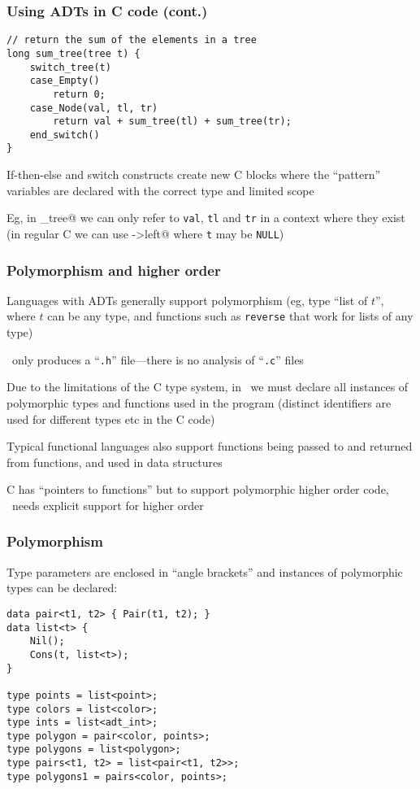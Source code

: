 \documentclass[t,t]{beamer}
\begin{document}
\begin{frame}[fragile]
\frametitle{Using ADTs in C code (cont.)}
\begin{verbatim}
// return the sum of the elements in a tree
long sum_tree(tree t) {
    switch_tree(t)
    case_Empty()
        return 0;
    case_Node(val, tl, tr)
        return val + sum_tree(tl) + sum_tree(tr);
    end_switch()
}
\end{verbatim}
If-then-else and switch constructs create new C blocks where
the ``pattern'' variables are declared with the correct type
and limited scope

Eg, in \verb@sum_tree@ we can only refer to \texttt{val},
\texttt{tl} and \texttt{tr} in a context where they exist
(in regular C we can use \verb@t->left@ where
\texttt{t} may be \texttt{NULL})  
\end{frame}

\begin{frame}
\frametitle{Polymorphism and higher order}
Languages with ADTs generally support polymorphism (eg, type
``list of $t$'', where $t$ can be any type, and functions such
as \texttt{reverse} that work for lists of any type)

\Adtpp\ only produces a ``\texttt{.h}'' file---there is no
analysis of ``\texttt{.c}'' files

Due to the limitations of the C type system, in \adtpp\ we
must declare all instances of polymorphic types and functions
used in the program
(distinct identifiers are used for different types etc in
the C code)

Typical functional languages also support functions being passed
to and returned from functions, and used in data structures

C has ``pointers to functions'' but to support polymorphic higher
order code, \adtpp\ needs explicit support for higher order
\end{frame}

\begin{frame}[fragile]
\frametitle{Polymorphism }
Type parameters are enclosed in ``angle brackets'' and
instances of polymorphic types can be declared:
\begin{verbatim}
data pair<t1, t2> { Pair(t1, t2); }
data list<t> {
    Nil();
    Cons(t, list<t>);
}

type points = list<point>;
type colors = list<color>;
type ints = list<adt_int>;
type polygon = pair<color, points>;
type polygons = list<polygon>;
type pairs<t1, t2> = list<pair<t1, t2>>;
type polygons1 = pairs<color, points>;
\end{verbatim}
\end{frame}
\end{document}
